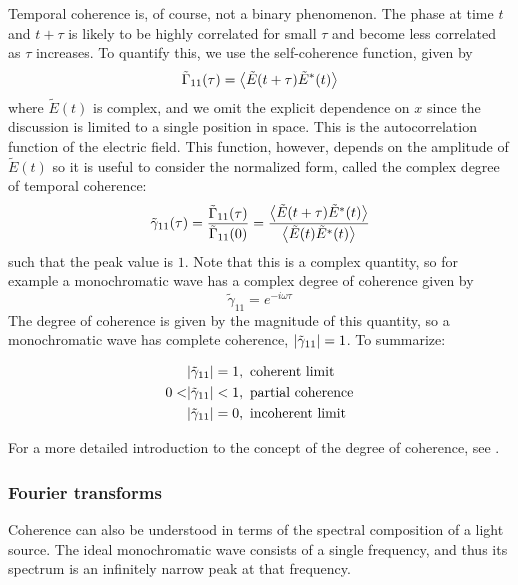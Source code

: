 Temporal coherence is, of course, not a binary phenomenon. The phase at time $t$ and $t+\tau$ is likely to be highly correlated for small $\tau$ and become less correlated as $\tau$ increases. To quantify this, we use the self-coherence function, given by 
\begin{equation}\label{eq:deg_coh}
\tilde{\Gamma}_{11}(\tau) = \expval{\tilde{E}(t+\tau)\tilde{E}^*(t)}
\end{equation}
where $\tilde{E}(t)$ is complex, and we omit the explicit dependence on $x$ since the discussion is limited to a single position in space. This is the autocorrelation function of the electric field. This function, however, depends on the amplitude of $\tilde{E}(t)$ so it is useful to consider the normalized form, called the complex degree of temporal coherence:
\begin{equation}\label{eq:deg_coh_norm}
\tilde{\gamma}_{11}(\tau) = \frac{\tilde{\Gamma}_{11}(\tau)}{\tilde{\Gamma}_{11}(0)}
= \frac{\expval{\tilde{E}(t+\tau)\tilde{E}^*(t)}}{\expval{\tilde{E}(t)\tilde{E}^*(t)}}
\end{equation}
such that the peak value is $1$. Note that this is a complex quantity, so for example a monochromatic wave has a complex degree of coherence given by  
\begin{equation}
{\tilde{\gamma}_{11}} = e^{-i\omega\tau}
\end{equation}
The degree of coherence is given by the magnitude of this quantity, so a monochromatic wave has complete coherence, $\abs{\tilde{\gamma}_{11}} = 1$. To summarize:

\begin{align} \label{eq:deg_coh_mag}
&\abs{\tilde{\gamma}_{11}} = 1, ~\textnormal{coherent limit}\\
0 < &\abs{\tilde{\gamma}_{11}} < 1, ~\textnormal{partial coherence}\\
&\abs{\tilde{\gamma}_{11}} = 0, ~\textnormal{incoherent limit}
\end{align}

For a more detailed introduction to the concept of the degree of coherence, see \cite[ch. 12]{Hecht2002}.

\subsubsection{Fourier transforms}
Coherence can also be understood in terms of the spectral composition of a light source. The ideal monochromatic wave consists of a single frequency, and thus its spectrum is an infinitely narrow peak at that frequency. 

